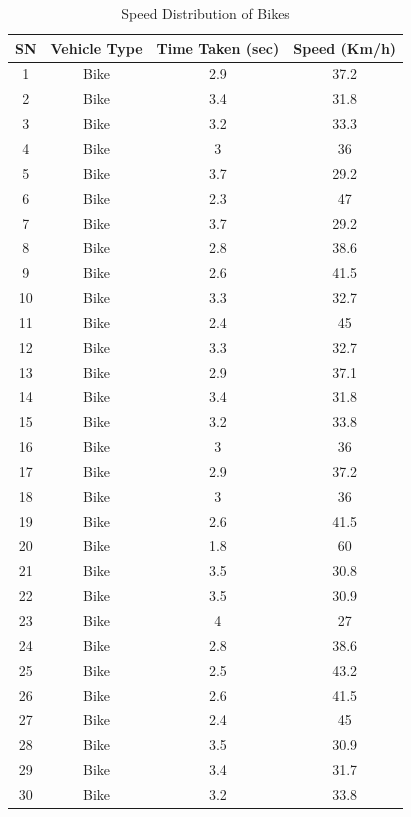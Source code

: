 \begin{table}[h!]
    \centering
    \caption{Speed Distribution of Bikes}
    \begin{tabular}{|c|c|c|c|}
        \hline
        \textbf{SN}	& \textbf{Vehicle Type}	& \textbf{Time Taken (sec)}	& \textbf{Speed (Km/h)} \\ \hline
        1	&Bike	&2.9	&37.2 \\ \hline
        2	&Bike	&3.4	&31.8 \\ \hline
        3	&Bike	&3.2	&33.3 \\ \hline
        4	&Bike	&3	&36 \\ \hline
        5	&Bike	&3.7	&29.2 \\ \hline
        6	&Bike	&2.3	&47 \\ \hline
        7	&Bike	&3.7	&29.2 \\ \hline
        8	&Bike	&2.8	&38.6 \\ \hline
        9	&Bike	&2.6	&41.5 \\ \hline
        10	&Bike	&3.3	&32.7 \\ \hline
        11	&Bike	&2.4	&45 \\ \hline
        12	&Bike	&3.3	&32.7 \\ \hline
        13	&Bike	&2.9	&37.1 \\ \hline
        14	&Bike	&3.4	&31.8 \\ \hline
        15	&Bike	&3.2	&33.8 \\ \hline
        16	&Bike	&3	&36 \\ \hline
        17	&Bike	&2.9	&37.2 \\ \hline
        18	&Bike	&3	&36 \\ \hline
        19	&Bike	&2.6	&41.5 \\ \hline
        20	&Bike	&1.8	&60 \\ \hline
        21	&Bike	&3.5	&30.8 \\ \hline
        22	&Bike	&3.5	&30.9 \\ \hline
        23	&Bike	&4	&27 \\ \hline
        24	&Bike	&2.8	&38.6 \\ \hline
        25	&Bike	&2.5	&43.2 \\ \hline
        26	&Bike	&2.6	&41.5 \\ \hline
        27	&Bike	&2.4	&45 \\ \hline
        28	&Bike	&3.5	&30.9 \\ \hline
        29	&Bike	&3.4	&31.7 \\ \hline
        30	&Bike	&3.2	&33.8 \\ \hline

\end{tabular}
\end{table}
